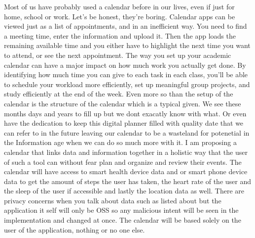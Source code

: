 Most of us have probably used a calendar before in our lives, even if just for home, school or work. Let's be honest, they're boring. Calendar apps can be viewed just as a list of appointments, and in an inefficient way. You need to find a meeting time, enter the information and upload it. Then the app loads the remaining available time and you either have to highlight the next time you want to attend, or see the next appointment.
The way you set up your academic calendar can have a major impact on how much work you actually get done. By identifying how much time you can give to each task in each class, you'll be able to schedule your workload more efficiently, set up meaningful group projects, and study efficiently at the end of the week.
Even more so than the setup of the calendar is the structure of the calendar which is a typical given. We see these months days and years to fill up but we dont exacatly know with what. Or even have the dedication to keep this digital planner filled with quality date that we can refer to in the future leaving our calendar to be a wasteland for potenetial in the Information age when we can do so much more with it.
I am proposing a calendar that links data and information together in a holistic way that the user of such a tool can without fear plan and organize and review their events.
The calendar will have access to smart health device data and or smart phone device data to get the amount of steps the user has taken, the heart rate of the user and the sleep of the user if accessible and lastly the location data as well.
There are privacy concerns when you talk about data such as listed about but the application it self will only be OSS so any malicious intent will be seen in the implementation and changed at once.
The calendar will be based solely on the user of the application, nothing or no one else.
